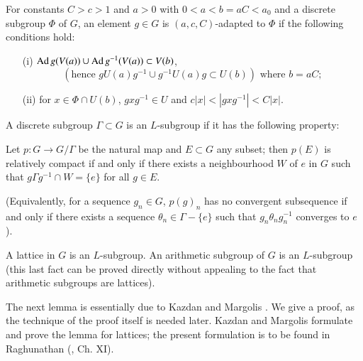 \setcounter{definition}{1}
\begin{definition}\label{art9-def1.2}
For constants $C > c > 1$ and $a > 0$ with $0 < a < b = aC < a_0$ and a discrete subgroup $\Phi$ of $G$, an element $g \in G$ is $(a, c, C)$-adapted to $\Phi$ if the following conditions hold:
\begin{itemize}
\item[(i)] $\operatorname{Ad} g(V(a)) \cup \operatorname{Ad} g^{-1} (V(a)) \subset V (b)$,
$$
(\text{hence } g U (a) g^{-1} \cup g^{-1} U (a) g \subset U (b)) \text{ where } b = a C;
$$

\item[(ii)] for $x \in \Phi \cap U (b)$, $g x g^{-1} \in U$ and $c|x| < | gxg^{-1} |< C |x|$.
\end{itemize}
\end{definition}

\begin{definition}\label{art9-def1.3}
A discrete subgroup $\Gamma \subset G$ is an $L$-subgroup if it has the following property:

Let $p : G \to G / \Gamma$ be the natural map and $E \subset G$ any subset; then $p (E)$ is relatively compact if and only if there exists a neighbourhood $W$ of $e$ in $G$ such that $g \Gamma g^{-1} \cap W = \{e\}$ for all $g \in E$.

(Equivalently, for a sequence $g_n \in G$, $p (g)_n$ has no convergent subsequence if and only if there exists a sequence $\theta_n \in \Gamma-\{e\}$ such that $g_n \theta_n g^{-1}_n$ converges to $e$).
\end{definition}


\begin{subremark}\label{art9-subrem1.4}
A lattice in $G$ is an $L$-subgroup. An arithmetic subgroup of $G$ is an $L$-subgroup (this last fact can be proved directly without appealing to the fact that arithmetic subgroups are lattices).
\end{subremark}

The next lemma is essentially due to Kazdan and Margolis \cite{art9-key1}. We give a proof, as the technique of the proof itself is needed later. Kazdan and Margolis \cite{art9-key1} formulate and prove the lemma for lattices; the present formulation is to be found in Raghunathan (\cite{art9-key1}, Ch. XI).

